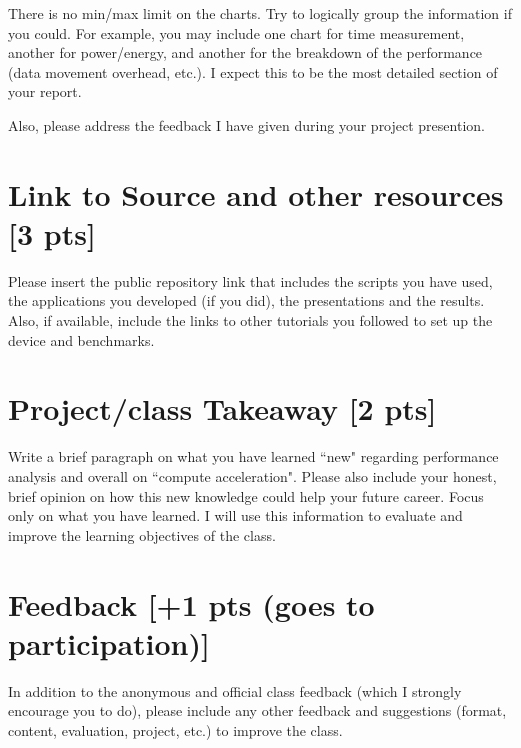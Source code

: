 \documentclass[sigconf,authorversion,nonacm]{acmart}
\begin{document}
There is no min/max limit on the charts. Try to logically group the information if you could. For example, you may include one chart for time measurement, another for power/energy, and another for the breakdown of the performance (data movement overhead, etc.). I expect this to be the most detailed section of your report.

Also, please address the feedback I have given during your project presention.

\section{Link to Source and other resources {\small {[3 pts]}}} 
Please insert the public repository link that includes the scripts you have used, the applications you developed (if you did), the presentations and the results. Also, if available, include the links to other tutorials you followed to set up the device and benchmarks.

\section{Project/class Takeaway {\small {[2 pts]}}}  
Write a brief paragraph on what you have learned ``new" regarding performance analysis and overall on ``compute acceleration". Please also include your honest, brief opinion on how this new knowledge could help your future career. Focus only on what you have learned. I will use this information to evaluate and improve the learning objectives of the class. 


\section{Feedback {\small {[+1 pts (goes to participation)]}}}  
In addition to the anonymous and official class feedback (which I strongly encourage you to do), please include any other feedback and suggestions (format, content, evaluation, project, etc.) to improve the class.




\end{document}
